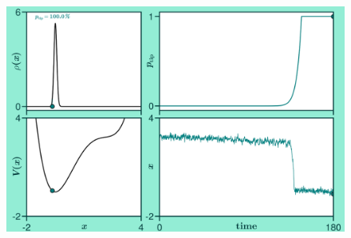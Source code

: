 \documentclass[./main.tex]{subfiles}
\begin{document}
\begin{frame}[label=slide09]
\begin{columns}
                \begin{figure}
                    \centering
                    \includegraphics[keepaspectratio, width=\textwidth]{../figures/figure.png}
                \end{figure}
        \end{columns}
\end{frame}
\end{document}
